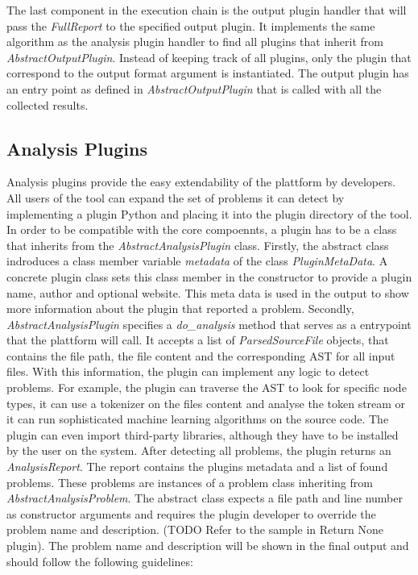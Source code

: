 The last component in the execution chain is the output plugin handler that will pass the \textit{FullReport} to the specified output plugin. It implements the same algorithm as the analysis plugin handler to find all plugins that inherit from \textit{AbstractOutputPlugin}. Instead of keeping track of all plugins, only the plugin that correspond to the output format argument is instantiated. The output plugin has an entry point as defined in \textit{AbstractOutputPlugin}  that is called with all the collected results.

\subsection{Analysis Plugins}
Analysis plugins provide the easy extendability of the plattform by developers. All users of the tool can expand the set of problems it can detect by implementing a plugin Python and placing it into the plugin directory of the tool. In order to be compatible with the core compoennts, a plugin has to be a class that inherits from the \textit{AbstractAnalysisPlugin} class. Firstly, the abstract class indroduces a class member variable \textit{metadata} of the class \textit{PluginMetaData}. A concrete plugin class sets this class member in the constructor to provide a plugin name, author and optional website. This meta data is used in the output to show more information about the plugin that reported a problem. Secondly, \textit{AbstractAnalysisPlugin} specifies a \textit{do\_analysis} method that serves as a entrypoint that the plattform will call. It accepts a list of \textit{ParsedSourceFile} objects, that contains the file path, the file content and the corresponding AST for all input files. With this information, the plugin can implement any logic to detect problems. 
For example, the plugin can traverse the AST to look for specific node types, it can use a tokenizer on the files content and analyse the token stream or it can run sophisticated machine learning algorithms on the source code.
The plugin can even import third-party libraries, although they have to be installed by the user on the system. After detecting all problems, the plugin returns an \textit{AnalysisReport}. The report contains the plugins metadata and a list of found problems. These problems are instances  of a problem class inheriting from \textit{AbstractAnalysisProblem}. The abstract class expects a file path and line number as constructor arguments and requires the plugin developer to override the problem name and description. (TODO Refer to the sample in Return None plugin). The problem name and description will be shown in the final output and should follow the following guidelines:
